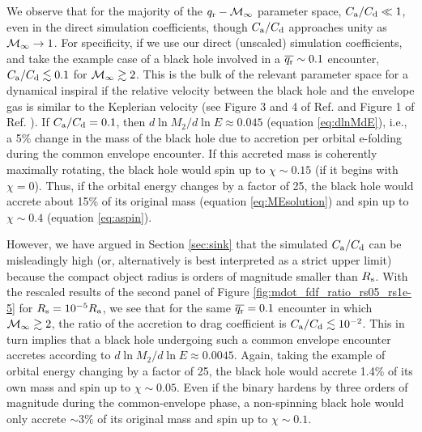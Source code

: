 We observe that for the majority of the $q_{\rm r}-{\cal M}_\infty$ parameter space, $C_{\rm a}/C_{\rm d} \ll 1$, even in the direct simulation coefficients, though $C_{\rm a}/C_{\rm d}$ approaches unity as ${\cal M}_\infty\rightarrow1$. For specificity, if we use our direct (unscaled) simulation coefficients, and take the example case of a black hole involved in a $\overline{q_{\rm r}}\sim 0.1$ encounter, $C_{\rm a}/C_{\rm d} \lesssim 0.1$ for ${\cal M}_\infty \gtrsim 2$.  This is the bulk of the relevant parameter space for a dynamical inspiral if the relative velocity between the black hole and the envelope gas is similar to the Keplerian velocity (see Figure 3 and 4 of Ref. \cite{MacLeod_2015} and Figure 1 of Ref. \cite{MacLeod:2017}). If $C_{\rm a}/C_{\rm d}=0.1$, then $d\ln M_2 / d\ln E \approx 0.045$ (equation \eqref{eq:dlnMdE}), i.e., a 5\% change in the mass of the black hole due to accretion per orbital e-folding during the common envelope encounter. If this accreted mass is coherently maximally rotating, the black hole would spin up to $\chi\sim 0.15$ (if it begins with $\chi=0$). Thus, if the orbital energy changes by a factor of 25, the black hole would accrete about 15\% of its original mass (equation \eqref{eq:MEsolution}) and spin up to $\chi\sim 0.4$ (equation \eqref{eq:aspin}).

However, we have argued in Section \ref{sec:sink} that the simulated $C_{\rm a}/C_{\rm d}$ can be misleadingly high (or, alternatively is best interpreted as a strict upper limit) because the compact object radius is orders of magnitude smaller than $R_{\rm s}$. With the rescaled results of the second panel of Figure \ref{fig:mdot_fdf_ratio_rs05_rs1e-5} for $R_{\rm s} = 10^{-5} R_{\rm a}$, we see that for the same $\overline{q_{\rm r}}=0.1$ encounter in which ${\cal M}_\infty \gtrsim 2$, the ratio of the accretion to drag coefficient is $C_{\rm a}/C_{\rm d} \lesssim 10^{-2}$. This in turn implies that a black hole undergoing such a common envelope encounter accretes according to $d\ln M_2 / d\ln E \approx 0.0045$. Again, taking the example of orbital energy changing by a factor of 25, the black hole would accrete 1.4\% of its own mass and spin up to $\chi \sim 0.05$.  Even if the binary hardens by three orders of magnitude during the common-envelope phase, a non-spinning black hole would only accrete $\sim 3\%$ of its original mass and spin up to $\chi \sim 0.1$.

